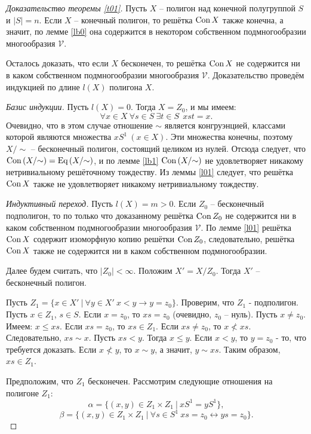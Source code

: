 \documentclass[a4paper]{article}
\newcommand{\Con}{\textnormal{Con}\, }
\newcommand{\Eq}{\textnormal{Eq}\, }
\begin{document}
	\begin{proof}[Доказательство теоремы \ref{t01}]
		Пусть $X$ -- полигон над конечной полугруппой $S$ и $|S| = n$. Если $X$ -- конечный полигон, то решётка $\Con X$ также конечна, а значит, по лемме \ref{lb0} она содержится в некотором собственном подмногообразии многообразия $\mathcal{V}$.
		\par Осталось доказать, что если $X$ бесконечен, то решётка $\Con X$ не содержится ни в каком собственном подмногообразии многообразия $\mathcal{V}$. Доказательство проведём индукцией по длине $l(X)$ полигона $X$.
		\par \textit{Базис индукции.} Пусть $l(X) = 0$. Тогда $X = Z_0$, и мы имеем: $$ \forall x \in X \ \forall s \in S \ \exists t \in S \ \ xst = x. $$ Очевидно, что в этом случае отношение $\sim$ является конгруэнцией, классами которой являются множества $xS^1\ (x \in X)$. Эти множества конечны, поэтому ${X}/{\sim}$ -- бесконечный полигон, состоящий целиком из нулей. Отсюда следует, что $\Con({X}/{\sim})=\Eq({X}/{\sim})$, и по лемме \ref{lb1} $\Con({X}/{\sim})$ не удовлетворяет никакому нетривиальному решёточному тождеству. Из леммы \ref{l01} следует, что решётка $\Con X$ также не удовлетворяет никакому нетривиальному тождеству.
		\par \textit{Индуктивный переход.} Пусть $l(X) = m > 0$. Если $Z_0$ -- бесконечный подполигон, то по только что доказанному решётка $\Con Z_0$ не содержится ни в каком собственном подмногообразии многообразия $\mathcal{V}$. По лемме \ref{l01} решётка $\Con X$ содержит изоморфную копию решётки $\Con Z_0$, следовательно, решётка $\Con X$ также не содержится ни в каком собственном подмногообразии.
		\par Далее будем считать, что $|Z_0| < \infty$. Положим $X'={X}/{Z_0}$. Тогда $X'$ -- бесконечный полигон.
		\par Пусть $Z_1 = \{x \in X' \ | \ \forall y  \in X' \ x < y \rightarrow y = z_0\}$. Проверим, что $Z_1$ - подполигон. Пусть $x \in Z_1$, $s \in S$. Если $x = z_0$, то $xs = z_0$ (очевидно, $z_0$ -- нуль). Пусть $x \neq z_0$. Имеем: $x \leqslant xs$. Если $xs = z_0$, то $xs \in Z_1$. Если $xs \neq z_0$, то $x \not < xs$. Следовательно, $xs \sim x$. Пусть $xs < y$. Тогда $x \leqslant y$. Если $x < y$, то $y = z_0$ - то, что требуется доказать. Если $x \not < y$, то $x \sim y$, а значит,  $y \sim xs$. Таким образом, $xs \in Z_1$.
		\par Предположим, что $Z_1$ бесконечен. Рассмотрим следующие отношения на полигоне $Z_1$: $$ \alpha = \{ (x,y) \in Z_1 \times Z_1 \ | \ xS^1 = yS^1 \}, $$ $$ \beta = \{ (x,y) \in Z_1 \times Z_1 \ | \ \forall s \in S^1 \ xs = z_0 \leftrightarrow ys = z_0 \}. $$

\end{proof}
\end{document}
